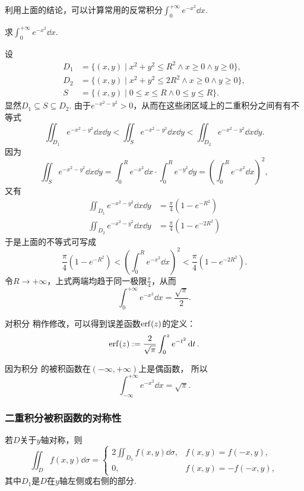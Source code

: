 利用上面的结论，可以计算常用的反常积分\(\int_0^{+\infty} e^{-x^2} \dd{x}\).
\begin{example}
求\(\int_0^{+\infty} e^{-x^2} \dd{x}\).
\begin{solution}
设\begin{align*}
D_1 &= \{ (x,y) \mid x^2+y^2 \leq R^2 \land x \geq 0 \land y \geq 0 \}, \\
D_2 &= \{ (x,y) \mid x^2+y^2 \leq 2 R^2 \land x \geq 0 \land y \geq 0 \}, \\
S &= \{ (x,y) \mid 0 \leq x \leq R \land 0 \leq y \leq R \}.
\end{align*}显然\(D_1 \subseteq S \subseteq D_2\).
由于\(e^{-x^2-y^2} > 0\)，从而在这些闭区域上的二重积分之间有有不等式\[
\iint_{D_1} e^{-x^2-y^2}\dd{x}\dd{y}
< \iint_{S} e^{-x^2-y^2}\dd{x}\dd{y}
< \iint_{D_2} e^{-x^2-y^2}\dd{x}\dd{y}.
\]因为\[
\iint_{S}{e^{-x^2-y^2}\dd{x}\dd{y}}
= \int_0^R e^{-x^2}\dd{x} \cdot \int_0^R e^{-y^2} \dd{y}
= \left( \int_0^R e^{-x^2} \dd{x} \right)^2,
\]又有\begin{align*}
\iint_{D_1}{e^{-x^2-y^2}\dd{x}\dd{y}}
&= \frac{\pi}{4} (1 - e^{-R^2}) \\
\iint_{D_2}{e^{-x^2-y^2}\dd{x}\dd{y}}
&= \frac{\pi}{4} (1 - e^{-2 R^2})
\end{align*}于是上面的不等式可写成\[
\frac{\pi}{4} (1 - e^{-R^2})
< \left( \int_0^R e^{-x^2} \dd{x} \right)^2
< \frac{\pi}{4} (1 - e^{-2 R^2}).
\]令\(R \to +\infty\)，上式两端均趋于同一极限\(\frac{\pi}{4}\)，从而
\begin{equation}\label{equation:重积分.常用积分1}
\int_0^{+\infty} e^{-x^2} \dd{x} = \frac{\sqrt{\pi}}{2}.
\end{equation}
\end{solution}
\end{example}
对积分  稍作修改，可以得到误差函数\(\erf(z)\)的定义：
\begin{equation}
	\erf(z) \defeq \frac{2}{\sqrt{\pi}} \int_0^z e^{-t^2} \dd{t}.
\end{equation}

因为积分  的被积函数在\((-\infty,+\infty)\)上是偶函数，
所以\begin{equation}\label{equation:重积分.常用积分2}
	\int_{-\infty}^{+\infty} e^{-x^2} \dd{x} = \sqrt{\pi}.
\end{equation}

\subsubsection{二重积分被积函数的对称性}
\begingroup
若\(D\)关于\(y\)轴对称，则\[
	\iint_D f(x,y) \dd\sigma
	= \left\{ \begin{array}{cc}
		2 \iint_{D_1} f(x,y) \dd\sigma, & f(x,y) = f(-x,y), \\
		0, & f(x,y) = -f(-x,y),
	\end{array} \right.
\]
其中\(D_1\)是\(D\)在\(y\)轴左侧或右侧的部分.

